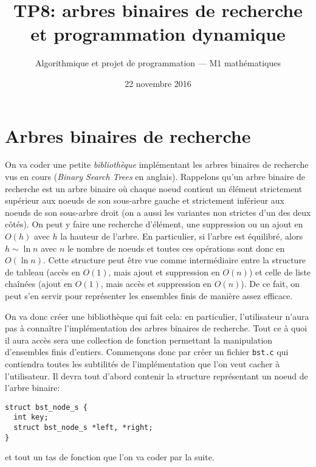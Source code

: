 \documentclass[french,a4paper]{article}
\title{\sffamily TP8: arbres binaires de recherche et programmation
 dynamique}%
\date{22 novembre 2016}%
\author{Algorithmique et projet de programmation --- M1
  mathématiques}%
\theoremstyle{definition}
\theoremstyle{remark}
\newcommand{\shell}[1]{\lstinline[style={},style=sh]|#1|}
\begin{document}
\maketitle

\section{Arbres binaires de recherche}
\label{sec:bst}

On va coder une petite {\em bibliothèque} implémentant les arbres
binaires de recherche vus en cours ({\em Binary Search Trees} en
anglais). Rappelons qu'un arbre binaire de recherche est un arbre
binaire où chaque noeud contient un élément strictement supérieur aux
noeuds de son sous-arbre gauche et strictement inférieur aux noeuds de
son sous-arbre droit (on a aussi les variantes non strictes d'un des
deux côtés). On peut y faire une recherche d'élément, une suppression
ou un ajout en $O(h)$ avec $h$ la hauteur de l'arbre. En particulier,
si l'arbre est équilibré, alors $h \sim \ln n$ avec $n$ le nombre de
noeuds et toutes ces opérations sont donc en $O(\ln n)$. Cette
structure peut être vue comme intermédiaire entre la structure de
tableau (accès en $O(1)$, mais ajout et suppression en $O(n)$) et
celle de liste chaînées (ajout en $O(1)$, mais accès et suppression en
$O(n)$). De ce fait, on peut s'en servir pour représenter les
ensembles finis de manière assez efficace.

\medskip

On va donc créer une bibliothèque qui fait cela: en particulier,
l'utilisateur n'aura pas à connaître l'implémentation des arbres
binaires de recherche. Tout ce à quoi il aura accès sera une
collection de fonction permettant la manipulation d'ensembles finis
d'entiers. Commençons donc par créer un fichier \shell{bst.c} qui
contiendra toutes les subtilités de l'implémentation que l'on veut
cacher à l'utilisateur. Il devra tout d'abord contenir la structure
représentant un noeud de l'arbre binaire:
\begin{lstlisting}
struct bst_node_s {
  int key;
  struct bst_node_s *left, *right;
}
\end{lstlisting}
et tout un tas de fonction que l'on va coder par la suite.
\end{document}
